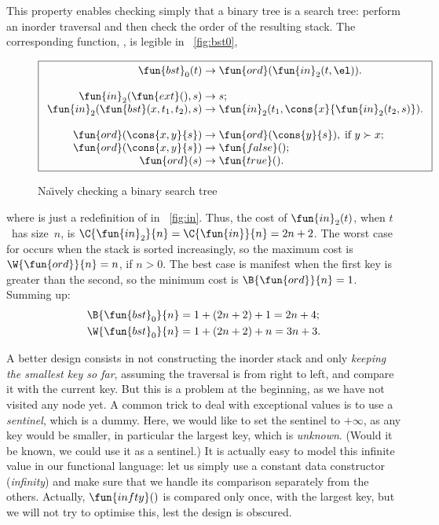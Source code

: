 This property enables checking simply that a binary tree is a search
tree: perform an inorder traversal and then check the order of the
resulting stack. The corresponding function,
, is legible in
\fig~\vref{fig:bst0},
\begin{figure}[t]
\begin{equation*}
\boxed{
\begin{array}{r@{\;}l@{\;}l}
\fun{bst}_0(t) & \rightarrow & \fun{ord}(\fun{in}_2(t,\el)).\\
\\
\fun{in}_2(\fun{ext}(),s) & \rightarrow & s;\\
\fun{in}_2(\fun{bst}(x,t_1,t_2),s) & \rightarrow
  & \fun{in}_2(t_1,\cons{x}{\fun{in}_2(t_2,s)}).\\
\\
\fun{ord}(\cons{x,y}{s}) & \rightarrow & \fun{ord}(\cons{y}{s}),
\;\text{if \(y \succ x\)};\\
\fun{ord}(\cons{x,y}{s}) & \rightarrow & \fun{false}();\\
\fun{ord}(s) & \rightarrow & \fun{true}().
\end{array}}
\end{equation*}
\caption{Na\"{\i}vely checking a binary search tree}
\label{fig:bst0}
\end{figure}
where  is just a
redefinition of  in
\fig~\vref{fig:in}. Thus, the cost of \(\fun{in}_2(t)\), when
\(t\)~has size~\(n\), is \(\C{\fun{in}_2}{n} = \C{\fun{in}}{n} = 2n +
2\). The worst case for  occurs when
the stack is sorted increasingly, so the maximum cost is
\(\W{\fun{ord}}{n} = n\), if \(n > 0\). The best case is manifest when
the first key is greater than the second, so the minimum cost is
\(\B{\fun{ord}}{n} = 1\). Summing up:
\begin{align*}
  \B{\fun{bst}_0}{n} & = 1 + (2n+2) + 1 = 2n + 4;\\
  \W{\fun{bst}_0}{n} & = 1 + (2n+2) + n = 3n + 3.
\end{align*}


A better design consists in not constructing the inorder stack and
only \emph{keeping the smallest key so far}, assuming the traversal is
from right to left, and compare it with the current key. But this is a
problem at the beginning, as we have not visited any node yet. A
common trick to deal with exceptional values is to use a
\emph{sentinel}, which is a dummy. Here, we would like
to set the sentinel to \(+\infty\), as any key would be smaller, in
particular the largest key, which is \emph{unknown}. (Would it be
known, we could use it as a sentinel.) It is actually easy to model
this infinite value in our functional language: let us simply use a
constant data constructor 
(\emph{infinity}) and make sure that we handle its comparison
separately from the others. Actually,
\(\fun{infty}()\) is compared only once,
with the largest key, but we will not try to optimise this, lest the
design is obscured.

